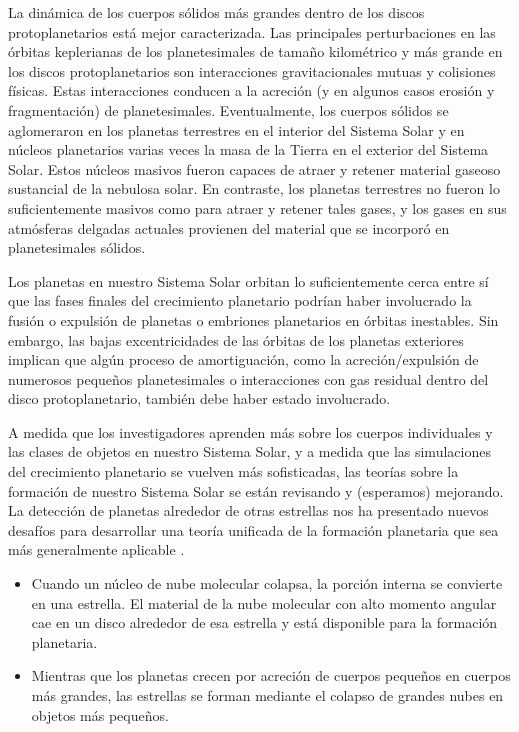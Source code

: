 \documentclass[12pt]{article}
\begin{document}
La dinámica de los cuerpos sólidos más grandes dentro de los discos protoplanetarios está mejor caracterizada. 
Las principales perturbaciones en las órbitas keplerianas de los planetesimales de tamaño kilométrico y más 
grande en los discos protoplanetarios son interacciones gravitacionales mutuas y colisiones físicas. Estas
interacciones conducen a la acreción (y en algunos casos erosión y fragmentación) de planetesimales. Eventualmente, 
los cuerpos sólidos se aglomeraron en los planetas terrestres en el interior del Sistema Solar y en núcleos 
planetarios varias veces la masa de la Tierra en el exterior del Sistema Solar. Estos núcleos masivos fueron capaces
de atraer y retener material gaseoso sustancial de la nebulosa solar. En contraste, los planetas terrestres no 
fueron lo suficientemente masivos como para atraer y retener tales gases, y los gases en sus
atmósferas delgadas actuales provienen del material que se incorporó en planetesimales sólidos.

Los planetas en nuestro Sistema Solar orbitan lo suficientemente cerca entre sí que las fases finales del 
crecimiento planetario podrían haber involucrado la fusión o expulsión de planetas o
embriones planetarios en órbitas inestables. Sin embargo, las bajas excentricidades de las órbitas de los 
planetas exteriores implican que algún proceso de amortiguación, como la acreción/expulsión de
numerosos pequeños planetesimales o interacciones con gas residual dentro del disco protoplanetario, 
también debe haber estado involucrado.

A medida que los investigadores aprenden más sobre los cuerpos individuales y las clases de objetos en 
nuestro Sistema Solar, y a medida que las simulaciones del crecimiento planetario se vuelven
más sofisticadas, las teorías sobre la formación de nuestro Sistema Solar se están revisando y (esperamos) 
mejorando. La detección de planetas alrededor de otras estrellas nos ha presentado nuevos 
desafíos para desarrollar una teoría unificada de la formación planetaria que sea más generalmente aplicable 
\parencite{PLanet_formation}.
\begin{itemize}
    \item Cuando un núcleo de nube molecular colapsa, la porción
    interna se convierte en una estrella. El material de la nube
    molecular con alto momento angular cae en un disco alrededor de
    esa estrella y está disponible para la formación planetaria.
    \item Mientras que los planetas crecen por acreción de cuerpos
    pequeños en cuerpos más grandes, las estrellas se forman mediante
    el colapso de grandes nubes en objetos más pequeños.
\end{itemize}
\end{document}
